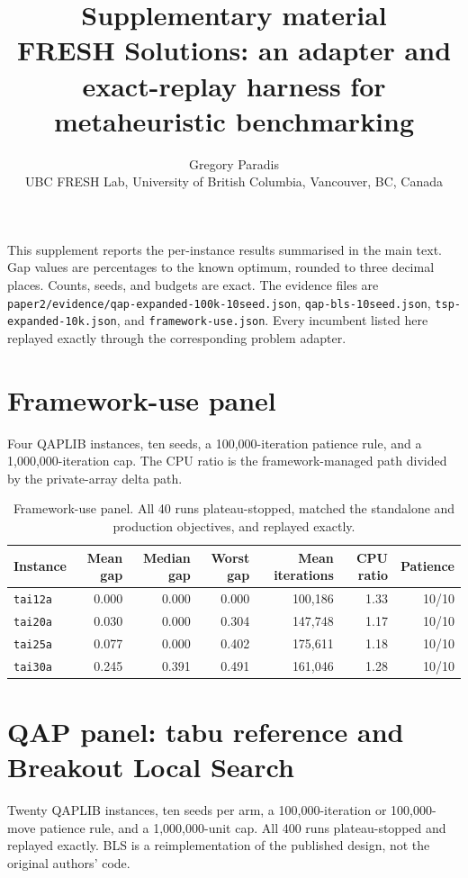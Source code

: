 \documentclass[10pt]{article}
\title{Supplementary material\\[0.4em]
\large FRESH Solutions: an adapter and exact-replay harness for metaheuristic benchmarking}
\author{Gregory Paradis\\UBC FRESH Lab, University of British Columbia, Vancouver, BC, Canada}
\date{}
\begin{document}
\maketitle

\noindent
This supplement reports the per-instance results summarised in the main text. Gap values are
percentages to the known optimum, rounded to three decimal places. Counts, seeds, and budgets are
exact. The evidence files are \texttt{paper2/evidence/qap-expanded-100k-10seed.json},
\texttt{qap-bls-10seed.json}, \texttt{tsp-expanded-10k.json}, and \texttt{framework-use.json}.
Every incumbent listed here replayed exactly through the corresponding problem adapter.

\section{Framework-use panel}

Four QAPLIB instances, ten seeds, a 100,000-iteration patience rule, and a 1,000,000-iteration cap.
The CPU ratio is the framework-managed path divided by the private-array delta path.

\begin{table}[H]
\centering
\caption{Framework-use panel. All 40 runs plateau-stopped, matched the standalone and production
objectives, and replayed exactly.}
\begin{tabular}{lrrrrrr}
\toprule
Instance & Mean gap & Median gap & Worst gap & Mean iterations & CPU ratio & Patience \\
\midrule
\texttt{tai12a} & 0.000 & 0.000 & 0.000 & 100,186 & 1.33 & 10/10 \\
\texttt{tai20a} & 0.030 & 0.000 & 0.304 & 147,748 & 1.17 & 10/10 \\
\texttt{tai25a} & 0.077 & 0.000 & 0.402 & 175,611 & 1.18 & 10/10 \\
\texttt{tai30a} & 0.245 & 0.391 & 0.491 & 161,046 & 1.28 & 10/10 \\
\bottomrule
\end{tabular}
\end{table}

\section{QAP panel: tabu reference and Breakout Local Search}

Twenty QAPLIB instances, ten seeds per arm, a 100,000-iteration or 100,000-move patience rule, and a
1,000,000-unit cap. All 400 runs plateau-stopped and replayed exactly. BLS is a reimplementation of
the published design, not the original authors' code.
\end{document}

